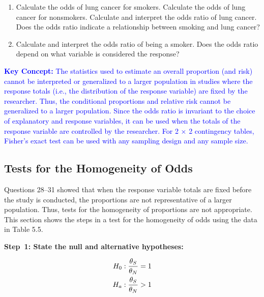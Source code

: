 \documentclass[
]{book}
\providecommand{\tightlist}{%
  \setlength{\itemsep}{0pt}\setlength{\parskip}{0pt}}
\begin{document}
\begin{enumerate}
\def\labelenumi{\arabic{enumi}.}
\setcounter{enumi}{29}
\tightlist
\item
  Calculate the odds of lung cancer for smokers. Calculate the odds of lung cancer for nonsmokers. Calculate and interpret the odds ratio of lung cancer. Does the odds ratio indicate a relationship between smoking and lung cancer?\\
\item
  Calculate and interpret the odds ratio of being a smoker. Does the odds ratio depend on what variable is considered the response?
\end{enumerate}

\textbf{\textcolor{blue}{Key Concept:}}
\textcolor{blue}{The statistics used to estimate an overall proportion (and risk) cannot be interpreted or generalized to a larger population in studies where the response totals (i.e., the distribution of the response variable) are fixed by the researcher. Thus, the conditional proportions and relative risk cannot be generalized to a larger population. Since the odds ratio is invariant to the choice of explanatory and response variables, it can be used when the totals of the response variable are controlled by the researcher. For 2 × 2 contingency tables, Fisher’s exact test can be used with any sampling design and any sample size.}

\hypertarget{tests-for-the-homogeneity-of-odds}{%
\subsection*{Tests for the Homogeneity of Odds}\label{tests-for-the-homogeneity-of-odds}}

Questions 28--31 showed that when the response variable totals are fixed before the study is conducted, the proportions are not representative of a larger population. Thus, tests for the homogeneity of proportions are not appropriate. This section shows the steps in a test for the homogeneity of odds using the data in Table 5.5.

\textbf{Step~1: State the null and alternative hypotheses:}

\begin{align}
H_0: \frac{\theta_S}{\theta_N} &= 1 \notag \\ 
H_a: \frac{\theta_S}{\theta_N} &> 1 \notag
\end{align}
\end{document}
